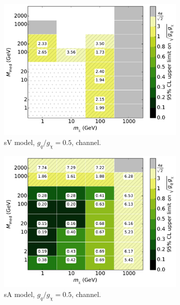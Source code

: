 \begin{figure}
\begin{subfigure}[t]{0.32\textwidth}
    \centering
    \includegraphics[width=1.\textwidth]{figures/grid_basepoints_SVD_rat05_monoWZ.pdf}
    \caption{sV model, $g_q/g_{\chi} = 0.5$, \monoWZ channel.}
    \vspace{0.75cm}
  \end{subfigure}
  \begin{subfigure}[t]{0.32\textwidth}
    \centering
    \includegraphics[width=1.\textwidth]{figures/grid_basepoints_SVD_rat05_monojet.pdf} %
    \caption{sA model, $g_q/g_{\chi} = 0.5$, \monojet channel.}
  \end{subfigure}
  \begin{subfigure}[t]{0.32\textwidth}
    \centering

\end{subfigure}
\end{figure}
